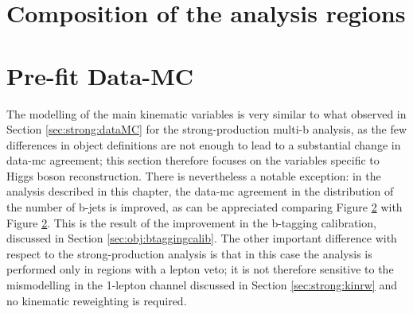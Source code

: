 \section{Composition of the analysis regions}

\FloatBarrier

\section{Pre-fit Data-MC}

The modelling of the main kinematic variables is very similar to what observed in Section \ref{sec:strong:dataMC} 
for the strong-production multi-b analysis, as the few differences in object definitions are not enough to 
lead to a substantial change in data-\gls{mc} agreement; 
this section therefore focuses on the variables specific to Higgs boson reconstruction.
There is nevertheless a notable exception: in the analysis described in this chapter, the data-\gls{mc} agreement in the 
distribution of the number of b-jets is improved, as can be appreciated comparing Figure \ref{} with Figure \ref{}.
This is the result of the improvement in the b-tagging calibration, discussed in Section \ref{sec:obj:btaggingcalib}.
The other important difference with respect to the strong-production analysis is that in this case the analysis is performed 
only in regions with a lepton veto; it is not therefore sensitive to the mismodelling in the 1-lepton channel discussed in Section 
\ref{sec:strong:kinrw} and no kinematic reweighting is required. 


